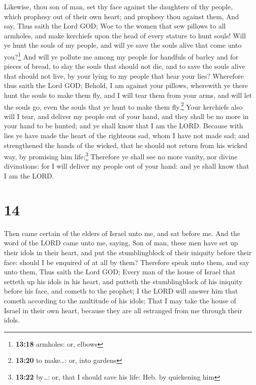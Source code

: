  Likewise, thou son of man, set thy face against the
daughters of thy people, which prophesy out of their own heart; and
prophesy thou against them,  And say, Thus saith the Lord
GOD; Woe to the women that sew pillows to all armholes, and make
kerchiefs upon the head of every stature to hunt souls! Will ye hunt the
souls of my people, and will ye save the souls alive that come unto
you?\footnote{\textbf{13:18} armholes: or, elbows}  And
will ye pollute me among my people for handfuls of barley and for pieces
of bread, to slay the souls that should not die, and to save the souls
alive that should not live, by your lying to my people that hear your
lies?  Wherefore thus saith the Lord GOD; Behold, I am
against your pillows, wherewith ye there hunt the souls to make them
fly, and I will tear them from your arms, and will let the souls go,
even the souls that ye hunt to make them fly.\footnote{\textbf{13:20} to
  make\ldots: or, into gardens}  Your kerchiefs also will
I tear, and deliver my people out of your hand, and they shall be no
more in your hand to be hunted; and ye shall know that I am the LORD.
 Because with lies ye have made the heart of the
righteous sad, whom I have not made sad; and strengthened the hands of
the wicked, that he should not return from his wicked way, by promising
him life:\footnote{\textbf{13:22} by\ldots: or, that I should save his
  life: Heb. by quickening him}  Therefore ye shall see
no more vanity, nor divine divinations: for I will deliver my people out
of your hand: and ye shall know that I am the LORD.

\hypertarget{section-13}{%
\section{14}\label{section-13}}

 Then came certain of the elders of Israel unto me, and
sat before me.  And the word of the LORD came unto me,
saying,  Son of man, these men have set up their idols in
their heart, and put the stumblingblock of their iniquity before their
face: should I be enquired of at all by them?  Therefore
speak unto them, and say unto them, Thus saith the Lord GOD; Every man
of the house of Israel that setteth up his idols in his heart, and
putteth the stumblingblock of his iniquity before his face, and cometh
to the prophet; I the LORD will answer him that cometh according to the
multitude of his idols;  That I may take the house of
Israel in their own heart, because they are all estranged from me
through their idols.


